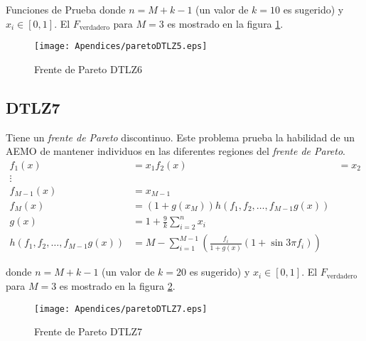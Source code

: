 \begin{chapter}{Funciones de Prueba}
donde $n=M+k-1$ (un valor de $k=10$ es sugerido) y $x_i\in[0,1]$. El $F_\text{verdadero}$ para $M=3$ es mostrado en la figura \ref{fig:DTLZ6}. 

\begin{figure}[h!]
 \centering
\texttt{[image: Apendices/paretoDTLZ5.eps]}
\caption{Frente de Pareto DTLZ6}
\label{fig:DTLZ6}
\end{figure}



\subsection*{DTLZ7}

Tiene un {\it frente de Pareto}  discontinuo. Este problema prueba la habilidad de un AEMO de mantener
individuos en las diferentes regiones del {\it frente de Pareto}.\\


\begin{align*}
f_1(x)&=x_1
f_2(x)&=x_2\\
\vdots&\\
f_{M-1}(x)&=x_{M-1}\\
f_{M}(x)&=(1+g(x_M))h(f_1,f_2,\dots,f_{M-1}g(x))\\
g(x)&=1+\frac{9}{k}\sum_{i=2}^nx_i\\
h(f_1,f_2,\dots,f_{M-1}g(x))&=M-\sum_{i=1}^{M-1}(\frac{f_i}{1+g(x)}(1+\sin{3\pi f_i}))
\end{align*}


donde $n=M+k-1$ (un valor de $k=20$ es sugerido) y $x_i\in[0,1]$. El $F_\text{verdadero}$ para $M=3$ es mostrado en la figura \ref{fig:DTLZ7}. 

\begin{figure}[h!]
 \centering
\texttt{[image: Apendices/paretoDTLZ7.eps]}
\caption{Frente de Pareto DTLZ7}
\label{fig:DTLZ7}
\end{figure}




\end{chapter}



















